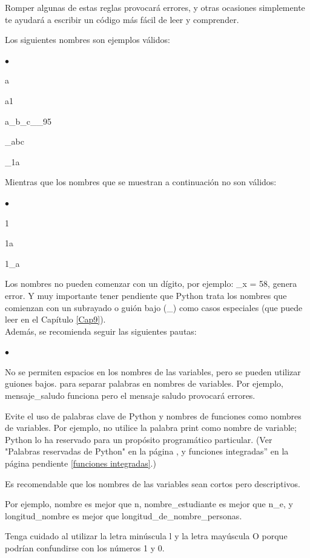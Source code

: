 Romper algunas de estas reglas provocará errores, y otras ocasiones  simplemente te ayudará a escribir un código  más fácil de leer y comprender. 

Los  siguientes  nombres son ejemplos válidos:
\begin{list}{$\bullet$}{}  
	
	\item a
	\item a1 
	\item a\_b\_c\_\_95
	\item \_abc
	\item \_1a
	
\end{list}

Mientras que los nombres que se muestran a continuación no son válidos:

\begin{list}{$\bullet$}{}  	
	\item 1
	\item 1a 
	\item 1\_a 	
\end{list}  

Los nombres no pueden comenzar con un dígito, por ejemplo: {\_x = 58}, genera error. Y muy importante tener pendiente que  Python trata los nombres que comienzan con un subrayado o guión bajo ({\ttfamily \_})  como casos especiales (que puede leer en el Capítulo  \ref{Cap9}).\\

Además,  se recomienda seguir las siguientes pautas: 
\begin{list}{$\bullet$}{}  
	
	\item No se permiten espacios en los nombres de las variables, pero se pueden utilizar guiones bajos.
	para separar palabras en nombres de variables. Por ejemplo, {\ttfamily mensaje\_saludo}  funciona
	pero el {\ttfamily mensaje saludo}  provocará errores. 
	
	\item Evite el uso de palabras clave de Python y nombres de funciones como nombres de variables. Por ejemplo, no utilice la palabra   {\ttfamily print}   como nombre de variable; Python lo ha reservado para un propósito programático particular. (Ver "{}Palabras reservadas de Python{}"{} en la página \pageref{palabras}, y funciones integradas” en la página pendiente  \ref{funciones integradas}.)	
	
	\item Es recomendable que los nombres de las variables sean cortos pero descriptivos. 
	
	Por ejemplo, {\ttfamily nombre}  es mejor que  {\ttfamily n}, {\ttfamily nombre\_estudiante} es mejor que {\ttfamily n\_e}, y {\ttfamily longitud\_nombre} es mejor que {\ttfamily longitud\_de\_nombre\_personas}.
	
	\item Tenga cuidado al utilizar la letra minúscula l y la letra mayúscula O
	porque podrían confundirse con los números 1 y 0. 	
	
\end{list}

